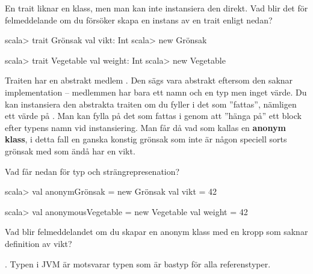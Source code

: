 \Subtask En trait liknar en klass, men man kan inte instansiera den direkt. Vad blir det för felmeddelande om du försöker skapa en instans av en trait enligt nedan?
\ifswedish
\begin{REPL}
scala> trait Grönsak { val vikt: Int }
scala> new Grönsak
\end{REPL}
\else
\begin{REPL}
scala> trait Vegetable { val weight: Int }
scala> new Vegetable
\end{REPL}
\fi


\Subtask Traiten \ifswedish{}\else{}\fi{} har en abstrakt medlem \ifswedish{}\else{}\fi. Den sägs vara abstrakt eftersom den saknar implementation -- medlemmen har bara ett namn och en typ men inget värde. Du kan instansiera den abstrakta traiten \ifswedish{}\else{}\fi{} om du fyller i det som ''fattas'', nämligen ett värde på \ifswedish{}\else{}\fi. Man kan fylla på det som fattas i genom att ''hänga på'' ett block efter typens namn vid instansiering. Man får då vad som kallas en \textbf{anonym klass}, i detta fall en ganska konstig grönsak som inte är någon speciell sorts grönsak med som ändå har en vikt.

Vad får \ifswedish{}\else{}\fi{} nedan för typ och strängrepresenation?
\ifswedish
\begin{REPL}
scala> val anonymGrönsak = new Grönsak { val vikt = 42 }
\end{REPL}
\else
\begin{REPL}
scala> val anonymousVegetable = new Vegetable { val weight = 42 }
\end{REPL}
\fi

\Subtask Vad blir felmeddelandet om du skapar en anonym klass \ifswedish{}\else{}\fi{} med en kropp som saknar definition av vikt?

\SOLUTION


\TaskSolved \what


\SubtaskSolved  {}. Typen  i JVM är motsvarar typen  som är bastyp för alla referenstyper.

